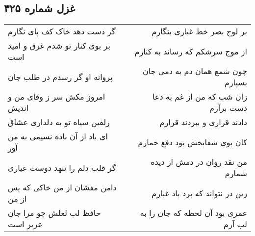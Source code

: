 \begin{center}
\section*{غزل شماره ۳۲۵}
\label{sec:sh325}
\begin{longtable}{l p{0.5cm} r}
گر دست دهد خاک کف پای نگارم
&&
بر لوح بصر خط غباری بنگارم
\\
بر بوی کنار تو شدم غرق و امید است
&&
از موج سرشکم که رساند به کنارم
\\
پروانه او گر رسدم در طلب جان
&&
چون شمع همان دم به دمی جان بسپارم
\\
امروز مکش سر ز وفای من و اندیش
&&
زان شب که من از غم به دعا دست برآرم
\\
زلفین سیاه تو به دلداری عشاق
&&
دادند قراری و ببردند قرارم
\\
ای باد از آن باده نسیمی به من آور
&&
کان بوی شفابخش بود دفع خمارم
\\
گر قلب دلم را ننهد دوست عیاری
&&
من نقد روان در دمش از دیده شمارم
\\
دامن مفشان از من خاکی که پس از من
&&
زین در نتواند که برد باد غبارم
\\
حافظ لب لعلش چو مرا جان عزیز است
&&
عمری بود آن لحظه که جان را به لب آرم
\\
\end{longtable}
\end{center}
